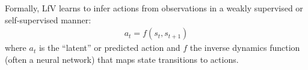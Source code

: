 Formally, \ac{LfV} learns to infer actions from observations in a weakly supervised or self-supervised manner:
\begin{align}
	a_t = f(s_t, s_{t+1})
\end{align}
where $a_t$ is the ``latent'' or predicted action and $f$ the inverse dynamics function (often a neural network) that maps state transitions to actions.

